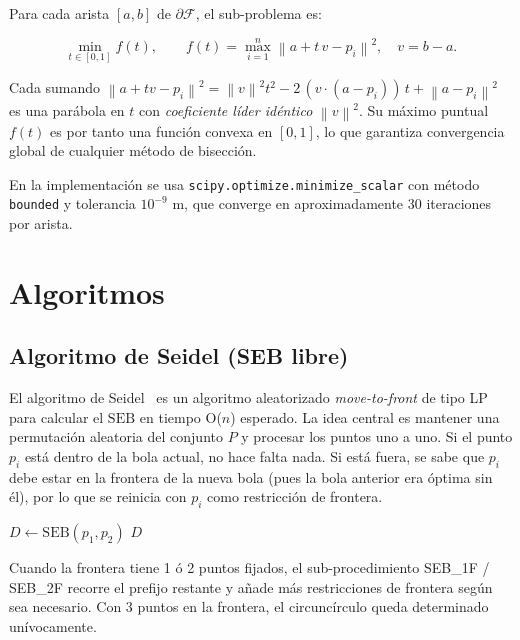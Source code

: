 \documentclass[11pt,a4paper]{article}
\theoremstyle{definition}
\theoremstyle{remark}
\newcommand{\RR}{\mathbb{R}}
\newcommand{\FF}{\mathcal{F}}
\newcommand{\seb}{\mathrm{SEB}}
\newcommand{\norm}[1]{\left\|#1\right\|}
\begin{document}
Para cada arista $[a, b]$ de $\partial\FF$, el sub-problema es:

\begin{equation}
  \min_{t \in [0,1]} f(t), \qquad
  f(t) = \max_{i=1}^n \norm{a + t\,v - p_i}^2, \quad v = b - a.
  \label{eq:seg}
\end{equation}

Cada sumando $\norm{a + tv - p_i}^2 = \norm{v}^2 t^2 - 2\,(v \cdot (a - p_i))\,t + \norm{a-p_i}^2$
es una parábola en $t$ con \emph{coeficiente líder idéntico} $\norm{v}^2$.
Su máximo puntual $f(t)$ es por tanto una función convexa en $[0,1]$, lo
que garantiza convergencia global de cualquier método de bisección.

En la implementación se usa \texttt{scipy.optimize.minimize\_scalar} con
método \texttt{bounded} y tolerancia $10^{-9}$ m, que converge en
aproximadamente 30 iteraciones por arista.

\section{Algoritmos}
\label{sec:algorithms}

\subsection{Algoritmo de Seidel (SEB libre)}

El algoritmo de Seidel~\cite{Seidel1991} es un algoritmo aleatorizado
\emph{move-to-front} de tipo LP para calcular el $\seb$ en tiempo O($n$)
esperado.  La idea central es mantener una permutación aleatoria del conjunto
$P$ y procesar los puntos uno a uno.  Si el punto $p_i$ está dentro de la bola
actual, no hace falta nada.  Si está fuera, se sabe que $p_i$ debe estar en la
frontera de la nueva bola (pues la bola anterior era óptima sin él), por lo que
se reinicia con $p_i$ como restricción de frontera.

\begin{algorithm}[H]
\caption{Seidel -- SEB libre en $\RR^2$}
\label{alg:seidel}
$D \leftarrow \seb(p_1, p_2)$\;
\Return $D$\;
\end{algorithm}

Cuando la frontera tiene 1 ó 2 puntos fijados, el sub-procedimiento
\textsc{SEB\_1F} / \textsc{SEB\_2F} recorre el prefijo restante y añade más
restricciones de frontera según sea necesario.  Con 3 puntos en la frontera,
el circuncírculo queda determinado unívocamente.
\end{document}
